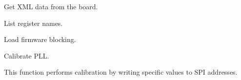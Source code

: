 \documentclass[letterpaper,10pt,english]{sphinxmanual}
\begin{document}
\begin{fulllineitems}
\begin{fulllineitems}

\pysigstartsignatures
{}
\pysigstopsignatures
\sphinxAtStartPar
Get XML data from the board.

\end{fulllineitems}



\begin{fulllineitems}

\pysigstartsignatures
{}
\pysigstopsignatures
\sphinxAtStartPar
List register names.
\begin{quote}\begin{description}
\sphinxAtStartPar
{} \textendash{} 

\end{description}\end{quote}

\end{fulllineitems}



\begin{fulllineitems}

\pysigstartsignatures
{}
\pysigstopsignatures
\sphinxAtStartPar
Load firmware blocking.

\end{fulllineitems}



\begin{fulllineitems}

\pysigstartsignatures
{}
\pysigstopsignatures
\sphinxAtStartPar
Calibrate PLL.

\sphinxAtStartPar
This function performs calibration by writing specific values to SPI addresses.
\begin{quote}\begin{description}
\sphinxAtStartPar
{} \textendash{} 


\end{description}
\end{quote}
\end{fulllineitems}
\end{fulllineitems}
\end{document}
